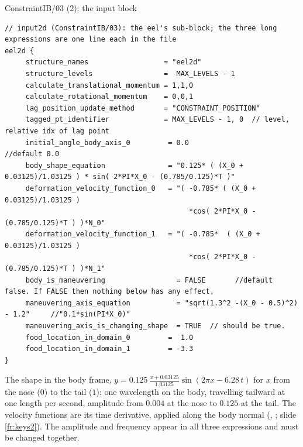\documentclass[aspectratio=169,11pt]{beamer}
\begin{document}
\begin{frame}[fragile]{ConstraintIB/03 (2): the input block}
\label{fr:ex03in}
\begin{lstlisting}[style=inputtiny]
// input2d (ConstraintIB/03): the eel's sub-block; the three long expressions are one line each in the file
eel2d {
     structure_names                  = "eel2d"
     structure_levels                 =  MAX_LEVELS - 1
     calculate_translational_momentum = 1,1,0
     calculate_rotational_momentum    = 0,0,1
     lag_position_update_method       = "CONSTRAINT_POSITION"
     tagged_pt_identifier             = MAX_LEVELS - 1, 0  // level, relative idx of lag point
     initial_angle_body_axis_0         = 0.0                     //default 0.0
     body_shape_equation               = "0.125* ( (X_0 + 0.03125)/1.03125 ) * sin( 2*PI*X_0 - (0.785/0.125)*T )"
     deformation_velocity_function_0   = "( -0.785* ( (X_0 + 0.03125)/1.03125 )
                                            *cos( 2*PI*X_0 - (0.785/0.125)*T ) )*N_0"
     deformation_velocity_function_1   = "( -0.785*  ( (X_0 + 0.03125)/1.03125 )
                                            *cos( 2*PI*X_0 - (0.785/0.125)*T ) )*N_1"
     body_is_maneuvering                 = FALSE       //default false. If FALSE then nothing below has any effect.
     maneuvering_axis_equation           = "sqrt(1.3^2 -(X_0 - 0.5)^2) - 1.2"     //"0.1*sin(PI*X_0)"
     maneuvering_axis_is_changing_shape  = TRUE  // should be true.
     food_location_in_domain_0         =  1.0
     food_location_in_domain_1         = -3.3
}
\end{lstlisting}
\footnotesize The shape in the body frame, $y = 0.125\,\frac{x + 0.03125}{1.03125}\sin(2\pi x - 6.28\,t)$ for $x$ from the nose ($0$) to the tail ($1$): one wavelength on the body, travelling tailward at one length per second, amplitude from $0.004$ at the nose to $0.125$ at the tail. The velocity functions are its time derivative, applied along the body normal (, ; slide \ref{fr:keys2}). The amplitude and frequency appear in all three expressions and must be changed together.
\end{frame}
\end{document}
